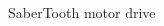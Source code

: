 \documentclass[10pt,a4paper,final]{article}
\begin{document}
\begin{spacing}{1.5}
\begin{multicols}{3}
\\
SaberTooth motor drive\\

\end{multicols}
\end{spacing}
\end{document}
